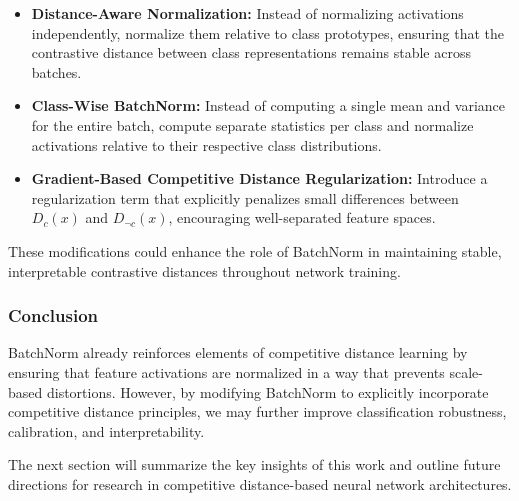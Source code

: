 \begin{itemize}
    \item \textbf{Distance-Aware Normalization:} Instead of normalizing activations independently, normalize them relative to class prototypes, ensuring that the contrastive distance between class representations remains stable across batches.
    \item \textbf{Class-Wise BatchNorm:} Instead of computing a single mean and variance for the entire batch, compute separate statistics per class and normalize activations relative to their respective class distributions.
    \item \textbf{Gradient-Based Competitive Distance Regularization:} Introduce a regularization term that explicitly penalizes small differences between \( D_c(x) \) and \( D_{\neg c}(x) \), encouraging well-separated feature spaces.
\end{itemize}

These modifications could enhance the role of BatchNorm in maintaining stable, interpretable contrastive distances throughout network training.

\subsubsection{Conclusion}

BatchNorm already reinforces elements of competitive distance learning by ensuring that feature activations are normalized in a way that prevents scale-based distortions. However, by modifying BatchNorm to explicitly incorporate competitive distance principles, we may further improve classification robustness, calibration, and interpretability. 

The next section will summarize the key insights of this work and outline future directions for research in competitive distance-based neural network architectures.
